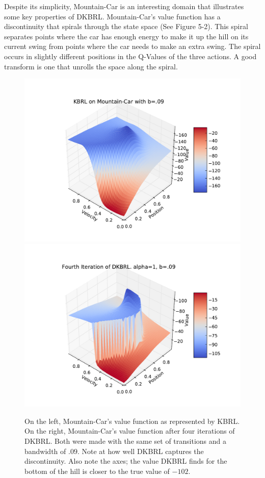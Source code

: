 Despite its simplicity, Mountain-Car is an interesting domain that
illustrates some key properties of DKBRL.
Mountain-Car's value function has a discontinuity that spirals through the
state space (See Figure 5-2).
This spiral separates points where the car has enough energy to make it up
the hill on its current swing from points where the car needs to make an
extra swing.
The spiral occurs in slightly different positions in the Q-Values of the three
actions.
A good transform is one that unrolls the space along the spiral.

\begin{figure}[!htb]
    \includegraphics[width=\linewidth]{figs/chap5/mc09first.pdf}
  \endminipage\hfill
    \includegraphics[width=\linewidth]{figs/chap5/mc09fourth.pdf}
  \endminipage
\caption[DKBRL approximation of Mountain-Car value function]
{On the left, Mountain-Car's value function as represented by KBRL.
On the right, Mountain-Car's value function after four iterations of DKBRL.
Both were made with the same set of transitions and a bandwidth of $.09$.
Note at how well DKBRL captures the discontinuity.
Also note the axes; the value DKBRL finds for the bottom of the hill
is closer to the true value of $-102$.}
\end{figure}

